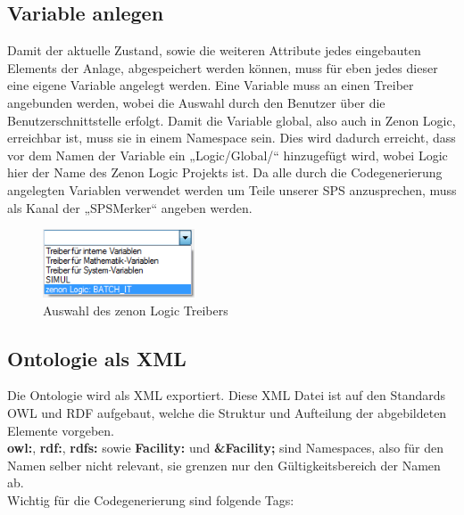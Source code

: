 

\subsection{Variable anlegen}
Damit der aktuelle Zustand, sowie die weiteren Attribute jedes eingebauten Elements der Anlage, abgespeichert werden können, muss für eben jedes dieser eine eigene Variable angelegt werden. Eine Variable muss an einen Treiber angebunden werden, wobei die Auswahl durch den Benutzer über die Benutzerschnittstelle erfolgt. Damit die Variable global, also auch in Zenon Logic, erreichbar ist, muss sie in einem Namespace sein. Dies wird dadurch erreicht, dass vor dem Namen der Variable ein „Logic/Global/“ hinzugefügt wird, wobei Logic hier der Name des Zenon Logic Projekts ist. Da alle durch die Codegenerierung angelegten Variablen verwendet werden um Teile unserer SPS anzusprechen, muss als Kanal der „SPSMerker“ angeben werden.
\begin{figure}[hbt!]
  \centering
  \includegraphics[width=0.4\textwidth]{graphics/implementation/treiberauswahl}
  \caption{Auswahl des zenon Logic Treibers}
\end{figure}



\subsection{Ontologie als XML}
Die Ontologie wird als XML exportiert. Diese XML Datei ist auf den Standards OWL und RDF aufgebaut, welche die Struktur und Aufteilung der abgebildeten Elemente vorgeben.\\

\textbf{owl:}, \textbf{rdf:}, \textbf{rdfs:} sowie \textbf{Facility:} und \textbf{\&Facility;} sind Namespaces, also für den Namen selber nicht relevant, sie grenzen nur den Gültigkeitsbereich der Namen ab.\\

Wichtig für die Codegenerierung sind folgende Tags:\\

